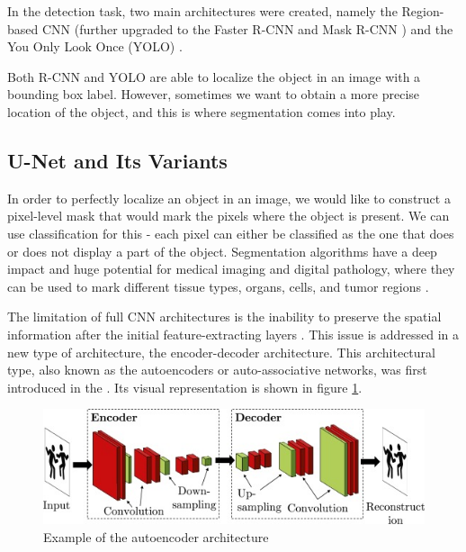 In the detection task, two main architectures were created, namely the Region-based CNN \cite{Girshick2014} (further upgraded to the Faster R-CNN and Mask R-CNN \cite{Ren2017}) and the You Only Look Once (YOLO) \cite{He2017}. 

Both R-CNN and YOLO are able to localize the object in an image with a bounding box label. However, sometimes we want to obtain a more precise location of the object, and this is where segmentation comes into play.

\subsection{U-Net and Its Variants}
In order to perfectly localize an object in an image, we would like to construct a pixel-level mask that would mark the pixels where the object is present. We can use classification for this - each pixel can either be classified as the one that does or does not display a part of the object. Segmentation algorithms have a deep impact and huge potential for medical imaging and digital pathology, where they can be used to mark different tissue types, organs, cells, and tumor regions \cite{Santosh2022-3}.

The limitation of full CNN architectures is the inability to preserve the spatial information after the initial feature-extracting layers \cite{Santosh2022-3}. This issue is addressed in a new type of architecture, the encoder-decoder architecture. This architectural type, also known as the autoencoders or auto-associative networks, was first introduced in the \cite{Kramer1992}. Its visual representation is shown in figure \ref{fig:autoencoder}.

\begin{figure}[H]
\begin{centering}
\includegraphics[width=12cm]{assets/images/encoder-decoder.jpg}
\par\end{centering}
\caption{Example of the autoencoder architecture \cite{Santosh2022-2}}
\label{fig:autoencoder}
\end{figure}


